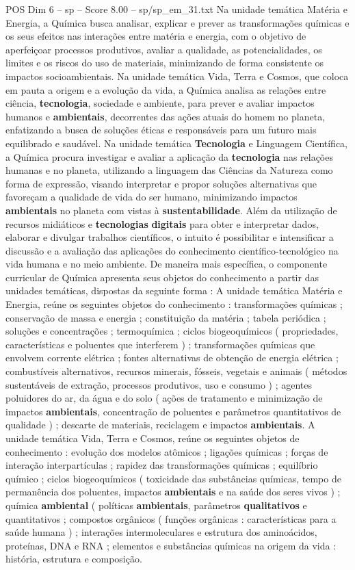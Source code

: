 \begin{textsample}{POS Dim 6 – sp – Score 8.00 – sp/sp\_em\_31.txt}
Na unidade temática Matéria e Energia, a Química busca analisar, explicar e prever as transformações químicas e os seus efeitos nas interações entre matéria e energia, com o objetivo de aperfeiçoar processos produtivos, avaliar a qualidade, as potencialidades, os limites e os riscos do uso de materiais, minimizando de forma consistente os impactos socioambientais.
Na unidade temática Vida, Terra e Cosmos, que coloca em pauta a origem e a evolução da vida, a Química analisa as relações entre ciência, \textbf{tecnologia}, sociedade e ambiente, para prever e avaliar impactos humanos e \textbf{ambientais}, decorrentes das ações atuais do homem no planeta, enfatizando a busca de soluções éticas e responsáveis para um futuro mais equilibrado e saudável.
Na unidade temática \textbf{Tecnologia} e Linguagem Científica, a Química procura investigar e avaliar a aplicação da \textbf{tecnologia} nas relações humanas e no planeta, utilizando a linguagem das Ciências da Natureza como forma de expressão, visando interpretar e propor soluções alternativas que favoreçam a qualidade de vida do ser humano, minimizando impactos \textbf{ambientais} no planeta com vistas à \textbf{sustentabilidade}.
Além da utilização de recursos midiáticos e \textbf{tecnologias} \textbf{digitais} para obter e interpretar dados, elaborar e divulgar trabalhos científicos, o intuito é possibilitar e intensificar a discussão e a avaliação das aplicações do conhecimento científico-tecnológico na vida humana e no meio ambiente.
De maneira mais específica, o componente curricular de Química apresenta seus objetos do conhecimento a partir das unidades temáticas, dispostas da seguinte forma : A unidade temática Matéria e Energia, reúne os seguintes objetos do conhecimento : transformações químicas ; conservação de massa e energia ; constituição da matéria ; tabela periódica ; soluções e concentrações ; termoquímica ; ciclos biogeoquímicos ( propriedades, características e poluentes que interferem ) ; transformações químicas que envolvem corrente elétrica ; fontes alternativas de obtenção de energia elétrica ; combustíveis alternativos, recursos minerais, fósseis, vegetais e animais ( métodos sustentáveis de extração, processos produtivos, uso e consumo ) ; agentes poluidores do ar, da água e do solo ( ações de tratamento e minimização de impactos \textbf{ambientais}, concentração de poluentes e parâmetros quantitativos de qualidade ) ; descarte de materiais, reciclagem e impactos \textbf{ambientais}.
A unidade temática Vida, Terra e Cosmos, reúne os seguintes objetos de conhecimento : evolução dos modelos atômicos ; ligações químicas ; forças de interação interpartículas ; rapidez das transformações químicas ; equilíbrio químico ; ciclos biogeoquímicos ( toxicidade das substâncias químicas, tempo de permanência dos poluentes, impactos \textbf{ambientais} e na saúde dos seres vivos ) ; química \textbf{ambiental} ( políticas \textbf{ambientais}, parâmetros \textbf{qualitativos} e quantitativos ; compostos orgânicos ( funções orgânicas : características para a saúde humana ) ; interações intermoleculares e estrutura dos aminoácidos, proteínas, DNA e RNA ; elementos e substâncias químicas na origem da vida : história, estrutura e composição.

\end{textsample}
